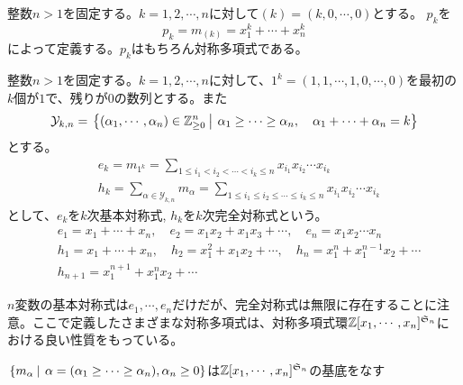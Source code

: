 \documentclass{ltjsreport}
\begin{document}
\begin{eg}[べき和対称式]
    整数$n>1$を固定する。$k=1,2,\cdots,n$に対して$(k)=(k,0,\cdots,0)$とする。
    $p_k$を
    \[
    p_k
    =m_{(k)}
    =x_1^k+\cdots+x_n^k
    \]
    によって定義する。$p_k$はもちろん対称多項式である。
\end{eg}

\begin{eg}
    整数$n>1$を固定する。$k=1,2,\cdots,n$に対して、$1^k=(1,1,\cdots,1,0,\cdots,0)$を最初の$k$個が$1$で、残りが$0$の数列とする。また
    \[
    \mathcal{Y}_{k,n}=\left.\left\{(\alpha_1,\cdots,\alpha_n)\in\mathbb{Z}_{\geq 0}^n \: \right| \: \alpha_1\geq \cdots\geq\alpha_n,\quad\alpha_1+\cdots+\alpha_n=k\right\}    
    \]
    とする。
    \begin{align*}
        &e_k=m_{1^k}=\sum_{1\leq i_1<i_2<\cdots<i_k\leq n}x_{i_1}x_{i_2}\cdots x_{i_k}\\
        &h_k=\sum_{\alpha\in\mathcal{Y}_{k,n}}m_\alpha=\sum_{1\leq i_1\leq i_2\leq\cdots\leq i_k\leq n}x_{i_1}x_{i_2}\cdots x_{i_k}
    \end{align*}
    として、$e_k$を$k$次基本対称式, $h_k$を$k$次完全対称式という。
    \begin{align*}
        &e_1=x_1+\cdots+x_n,\quad e_2=x_1x_2+x_1x_3+\cdots,\quad e_n=x_1x_2\cdots x_n\\
        &h_1=x_1+\cdots+x_n,\quad h_2=x_1^2+x_1x_2+\cdots, \quad h_n=x_1^n+x_1^{n-1}x_2+\cdots\\
        &h_{n+1}=x_1^{n+1}+x_1^nx_2+\cdots
    \end{align*}
\end{eg}


$n$変数の基本対称式は$e_1,\cdots, e_n$だけだが、完全対称式は無限に存在することに注意。ここで定義したさまざまな対称多項式は、対称多項式環$\mathbb{Z}[x_1,\cdots,x_n]^{\mathfrak{S}_n}$における良い性質をもっている。

\begin{prop}\label{m_is_basis}
    $\left.\left\{m_\alpha \: \right| \: \alpha=(\alpha_1\geq\cdots\geq\alpha_n), \alpha_n\geq 0\right\}$は$\mathbb{Z}[x_1,\cdots,x_n]^{\mathfrak{S}_n}$の基底をなす
\end{prop}
\end{document}
